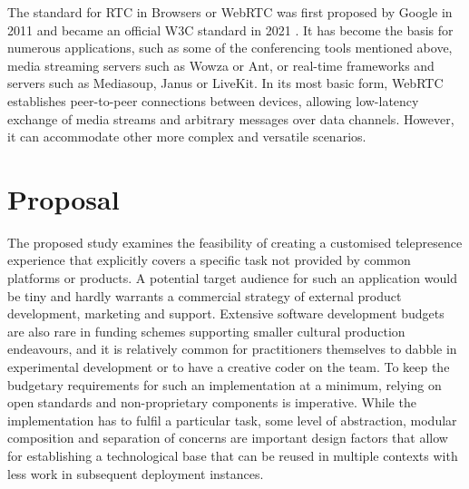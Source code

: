 The standard for \ac{RTC} in Browsers or \ac{WebRTC} \parencite{webRtcSpec} was first proposed by Google in 2011 and became an official \ac{W3C} standard in 2021 \parencite{webRtcOfficialWebStandard}.
It has become the basis for numerous applications, such as some of the conferencing tools mentioned above, media streaming servers such as Wowza or Ant, or real-time frameworks and servers such as Mediasoup, Janus or LiveKit.
In its most basic form, \ac{WebRTC} establishes peer-to-peer connections between devices, allowing low-latency exchange of media streams and arbitrary messages over data channels. However, it can accommodate other more complex and versatile scenarios.

\section{Proposal}

The proposed study examines the feasibility of creating a customised telepresence experience that explicitly covers a specific task not provided by common platforms or products.
A potential target audience for such an application would be tiny and hardly warrants a commercial strategy of external product development, marketing and support.
Extensive software development budgets are also rare in funding schemes supporting smaller cultural production endeavours, and it is relatively common for practitioners themselves to dabble in experimental development or to have a creative coder on the team.
To keep the budgetary requirements for such an implementation at a minimum, relying on open standards and non-proprietary components is imperative.
While the implementation has to fulfil a particular task, some level of abstraction, modular composition and separation of concerns are important design factors that allow for establishing a technological base that can be reused in multiple contexts with less work in subsequent deployment instances.

